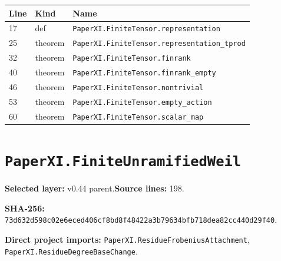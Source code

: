 \documentclass[10pt,oneside]{book}
\begin{document}
\begin{longtable}{@{}p{}p{}p{}@{}}\toprule Line&Kind&Name\\\midrule\endhead

17&def&\nolinkurl{PaperXI.FiniteTensor.representation}\\

25&theorem&\nolinkurl{PaperXI.FiniteTensor.representation_tprod}\\

32&theorem&\nolinkurl{PaperXI.FiniteTensor.finrank}\\

40&theorem&\nolinkurl{PaperXI.FiniteTensor.finrank_empty}\\

46&theorem&\nolinkurl{PaperXI.FiniteTensor.nontrivial}\\

53&theorem&\nolinkurl{PaperXI.FiniteTensor.empty_action}\\

60&theorem&\nolinkurl{PaperXI.FiniteTensor.scalar_map}\\

\bottomrule\end{longtable}

\section{\texorpdfstring{\nolinkurl{PaperXI.FiniteUnramifiedWeil}}{PaperXI.FiniteUnramifiedWeil}}\label{module:PaperXI.FiniteUnramifiedWeil}

\textbf{Selected layer:} v0.44 parent.\quad\textbf{Source lines:} 198.\par\textbf{SHA-256:} {\scriptsize\nolinkurl{73d632d598c02e6eced406cf8bd8f48422a3b79634bfb718dea82cc440d29f40}}.


\textbf{Direct project imports:} \nolinkurl{PaperXI.ResidueFrobeniusAttachment}, \nolinkurl{PaperXI.ResidueDegreeBaseChange}.
\end{document}
